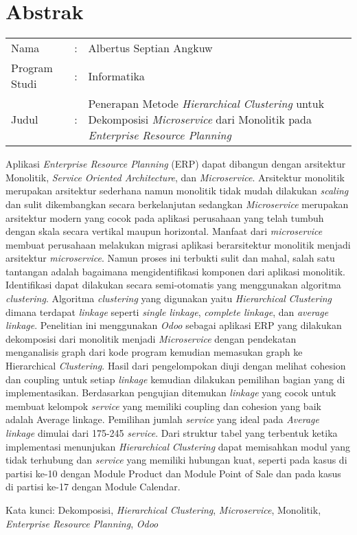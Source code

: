 \chapter*{Abstrak}

\begin{longtable}{@{}p{2.5cm} l p{10.3cm}}
	Nama 			& : & Albertus Septian Angkuw \\
	Program Studi	& : & Informatika \\
	Judul			& : & Penerapan Metode \textit{Hierarchical Clustering} untuk Dekomposisi \textit{Microservice} dari Monolitik pada \textit{Enterprise Resource Planning}\\
\end{longtable}
 
 Aplikasi \textit{Enterprise Resource Planning} (ERP) dapat dibangun dengan arsitektur Monolitik, \textit{Service Oriented Architecture}, dan \textit{Microservice}. Arsitektur monolitik merupakan arsitektur sederhana namun monolitik tidak mudah dilakukan \textit{scaling} dan sulit dikembangkan secara berkelanjutan sedangkan \textit{Microservice} merupakan arsitektur modern yang cocok pada aplikasi perusahaan yang telah tumbuh dengan skala secara vertikal maupun horizontal. Manfaat dari \textit{microservice} membuat   perusahaan melakukan migrasi aplikasi berarsitektur monolitik menjadi arsitektur \textit{microservice}. Namun proses ini terbukti sulit dan mahal, salah satu tantangan adalah bagaimana mengidentifikasi komponen dari aplikasi monolitik. Identifikasi dapat dilakukan secara semi-otomatis yang menggunakan algoritma \textit{clustering}. Algoritma \textit{clustering} yang digunakan yaitu \textit{Hierarchical} \textit{Clustering} dimana terdapat \textit{linkage} seperti \textit{single linkage}, \textit{complete linkage}, dan \textit{average linkage}.
Penelitian ini menggunakan \textit{Odoo} sebagai aplikasi ERP yang dilakukan dekomposisi dari monolitik menjadi \textit{Microservice} dengan pendekatan menganalisis graph dari kode program kemudian memasukan graph ke Hierarchical \textit{Clustering}. Hasil dari pengelompokan diuji dengan melihat cohesion dan coupling untuk setiap \textit{linkage} kemudian dilakukan pemilihan bagian yang di implementasikan. Berdasarkan pengujian ditemukan \textit{linkage} yang cocok untuk membuat kelompok \textit{service} yang memiliki coupling dan cohesion yang baik adalah Average linkage. Pemilihan jumlah \textit{service} yang ideal pada \textit{Average linkage} dimulai dari 175-245 \textit{service}. Dari struktur tabel yang terbentuk ketika implementasi menunjukan \textit{Hierarchical} \textit{Clustering} dapat memisahkan modul yang tidak terhubung dan \textit{service} yang memiliki hubungan kuat, seperti pada kasus di partisi ke-10 dengan Module Product dan Module Point of Sale dan pada kasus di partisi ke-17 dengan Module Calendar.

\noindent Kata kunci: Dekomposisi, \textit{Hierarchical Clustering}, \textit{Microservice}, Monolitik, \textit{Enterprise Resource Planning}, \textit{Odoo}